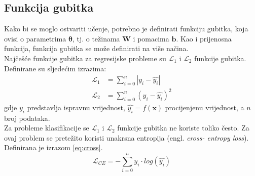 \documentclass[times, utf8, zavrsni, numeric]{fer}
\renewcommand{\vec}[1]{\mathbf{#1}}
\begin{document}
\subsection{Funkcija gubitka}
Kako bi se moglo ostvariti učenje, potrebno je definirati funkciju gubitka,
koja ovisi o parametrima $\pmb{\theta}$, tj. o težinama $\vec{W}$ i pomacima
$\vec{b}$. Kao i prijenosna funkcija, funkcija gubitka se može definirati
na više načina.
\\\indent Najčešće funkcije gubitka za regresijske probleme su $\mathcal{L}_1$ i
$\mathcal{L}_2$ funkcije gubitka. Definirane su sljedećim izrazima:
\begin{align}
	\mathcal{L}_1 &= \sum_{i=0}^{n}|y_i - \hat{y_i}| \\
	\mathcal{L}_2 &= \sum_{i=0}^{n}(y_i - \hat{y_i})^2
\end{align}
gdje $y_i$ predstavlja ispravnu vrijednost, $\hat{y_i}=f(\vec{x})$ procijenjenu 
vrijednost, a $n$ broj podataka. 
\\\indent Za probleme klasifikacije se $\mathcal{L}_1$ i $\mathcal{L}_2$ 
funkcije gubitka ne koriste toliko često.
Za ovaj problem se pretežito koristi unakrsna entropija (engl. \textit{cross-
entropy loss}). Definirana je izrazom \ref{eq:cross}.
\begin{equation}
	\mathcal{L}_{CE} = -\sum_{i=0}^n y_i \cdot log(\hat{y_i})
	\label{eq:cross}
\end{equation}
\end{document}
